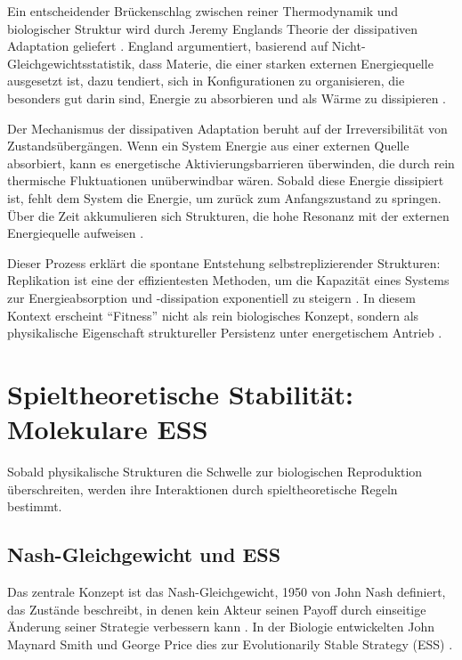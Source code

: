 \documentclass[12pt,a4paper]{article}
\theoremstyle{remark}
\begin{document}
Ein entscheidender Br\"uckenschlag zwischen reiner Thermodynamik und biologischer Struktur wird durch Jeremy Englands Theorie der dissipativen Adaptation geliefert \citep{EnglandJCP,EnglandNano}. England argumentiert, basierend auf Nicht-Gleichgewichtsstatistik, dass Materie, die einer starken externen Energiequelle ausgesetzt ist, dazu tendiert, sich in Konfigurationen zu organisieren, die besonders gut darin sind, Energie zu absorbieren und als W\"arme zu dissipieren \citep{EnglandJCP}.

Der Mechanismus der dissipativen Adaptation beruht auf der Irreversibilit\"at von Zustands\"uberg\"angen. Wenn ein System Energie aus einer externen Quelle absorbiert, kann es energetische Aktivierungsbarrieren \"uberwinden, die durch rein thermische Fluktuationen un\"uberwindbar w\"aren. Sobald diese Energie dissipiert ist, fehlt dem System die Energie, um zur\"uck zum Anfangszustand zu springen. \"Uber die Zeit akkumulieren sich Strukturen, die hohe Resonanz mit der externen Energiequelle aufweisen \citep{EnglandNano}.

Dieser Prozess erkl\"art die spontane Entstehung selbstreplizierender Strukturen: Replikation ist eine der effizientesten Methoden, um die Kapazit\"at eines Systems zur Energieabsorption und -dissipation exponentiell zu steigern \citep{EnglandNano}. In diesem Kontext erscheint ``Fitness'' nicht als rein biologisches Konzept, sondern als physikalische Eigenschaft struktureller Persistenz unter energetischem Antrieb \citep{EnglandJCP}.

\section{Spieltheoretische Stabilit\"at: Molekulare ESS}
\label{sec:molecular}

Sobald physikalische Strukturen die Schwelle zur biologischen Reproduktion \"uberschreiten, werden ihre Interaktionen durch spieltheoretische Regeln bestimmt.

\subsection{Nash-Gleichgewicht und ESS}

Das zentrale Konzept ist das Nash-Gleichgewicht, 1950 von John Nash definiert, das Zust\"ande beschreibt, in denen kein Akteur seinen Payoff durch einseitige \"Anderung seiner Strategie verbessern kann \citep{NashPNAS,NashSFI}. In der Biologie entwickelten John Maynard Smith und George Price dies zur Evolutionarily Stable Strategy (ESS) \citep{MaynardSmithPrice1973,MaynardSmith1982}.
\end{document}
